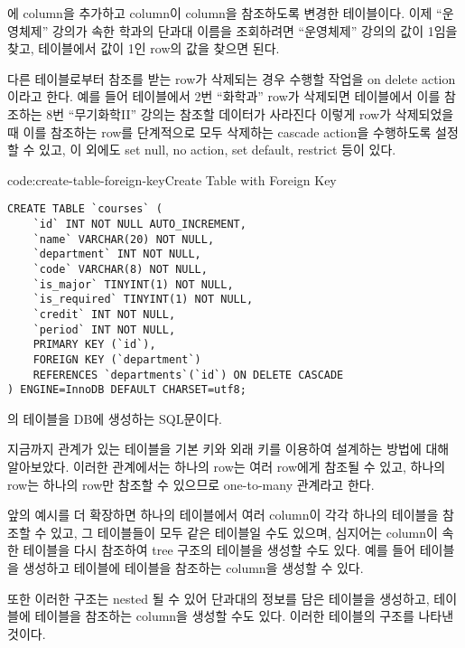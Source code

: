 \는 에  column을 추가하고  column이  column을 참조하도록 변경한 테이블이다. 이제 ``운영체제'' 강의가 속한 학과의 단과대 이름을 조회하려면 ``운영체제'' 강의의  값이 1임을 찾고,  테이블에서  값이 1인 row의  값을 찾으면 된다.

다른 테이블로부터 참조를 받는 row가 삭제되는 경우 수행할 작업을 on delete action이라고 한다. 예를 들어  테이블에서 2번 ``화학과'' row가 삭제되면  테이블에서 이를 참조하는 8번 ``무기화학II'' 강의는 참조할 데이터가 사라진다 이렇게 row가 삭제되었을 때 이를 참조하는 row를 단계적으로 모두 삭제하는 cascade action을 수행하도록 설정할 수 있고, 이 외에도 set null, no action, set default, restrict 등이 있다.

\begin{codeenv}{code:create-table-foreign-key}{Create  Table with Foreign Key}\begin{verbatim}
CREATE TABLE `courses` (
    `id` INT NOT NULL AUTO_INCREMENT,
    `name` VARCHAR(20) NOT NULL,
    `department` INT NOT NULL,
    `code` VARCHAR(8) NOT NULL,
    `is_major` TINYINT(1) NOT NULL,
    `is_required` TINYINT(1) NOT NULL,
    `credit` INT NOT NULL,
    `period` INT NOT NULL,
    PRIMARY KEY (`id`),
    FOREIGN KEY (`department`)
    REFERENCES `departments`(`id`) ON DELETE CASCADE
) ENGINE=InnoDB DEFAULT CHARSET=utf8;
\end{verbatim}
\end{codeenv}

\는 의 테이블을 DB에 생성하는 SQL문이다.

지금까지 관계가 있는 테이블을 기본 키와 외래 키를 이용하여 설계하는 방법에 대해 알아보았다. 이러한 관계에서는 하나의  row는 여러  row에게 참조될 수 있고, 하나의  row는 하나의  row만 참조할 수 있으므로 one-to-many 관계라고 한다.

앞의 예시를 더 확장하면 하나의 테이블에서 여러 column이 각각 하나의 테이블을 참조할 수 있고, 그 테이블들이 모두 같은 테이블일 수도 있으며, 심지어는 column이 속한 테이블을 다시 참조하여 tree 구조의 테이블을 생성할 수도 있다. 예를 들어  테이블을 생성하고  테이블에  테이블을 참조하는  column을 생성할 수 있다.

또한 이러한 구조는 nested 될 수 있어 단과대의 정보를 담은  테이블을 생성하고,  테이블에  테이블을 참조하는 column을 생성할 수도 있다. \은 이러한  테이블의 구조를 나타낸 것이다.

